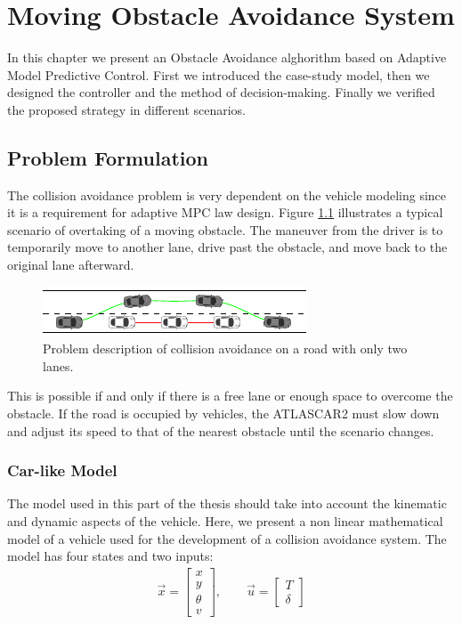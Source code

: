 \chapter{Moving Obstacle Avoidance System}
In this chapter we present an Obstacle Avoidance alghorithm based on Adaptive Model Predictive Control. First we introduced the case-study model, then we designed the controller and the method of decision-making. Finally we verified the proposed strategy in different scenarios.

\section{Problem Formulation}
The collision avoidance problem is very dependent on the vehicle modeling since it is a requirement for  adaptive MPC law design. Figure \ref{fig:obstacleAvoidance} illustrates a typical scenario of overtaking of a moving obstacle. The maneuver from the driver is to temporarily move to another lane, drive past the obstacle, and move back to the original lane afterward. 
\begin{figure}[!h]
	\centering
	\includegraphics[width=\textwidth]{./figure/obstacleAvoidance/obstacleAvoidance.pdf}
	\caption{Problem description of collision avoidance on a road with only two lanes.}
	\label{fig:obstacleAvoidance}
\end{figure}

This is possible if and only if there is a free lane or enough space to overcome the obstacle. If the road is occupied by vehicles, the ATLASCAR2 must slow down and adjust its speed to that of the nearest obstacle until the scenario changes.

\subsection{Car-like Model}
The model used in this part of the thesis should take into account the kinematic and dynamic aspects of the vehicle. Here, we present a non linear mathematical model of a vehicle used for the development of a collision avoidance system. The model has four states and two inputs:
\begin{equation}
\begin{array}{cc}
\vec{x}=\begin{bmatrix}
x\\y\\\theta\\v 
\end{bmatrix},\qquad 
\vec{u}=\begin{bmatrix}
T\\\delta 
\end{bmatrix}
\end{array} 
\end{equation}

